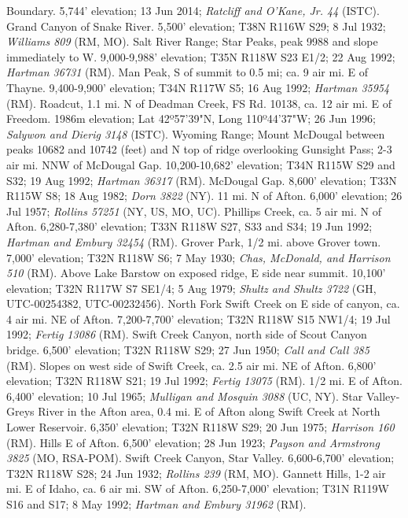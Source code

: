 Boundary. 5,744' elevation; 13 Jun 2014;
\textit{Ratcliff and O'Kane, Jr. 44} (ISTC).
Grand Canyon of Snake River. 5,500' elevation; T38N R116W S29; 8 Jul 1932;
\textit{Williams 809} (RM, MO).
Salt River Range; Star Peaks, peak 9988 and slope immediately to W.
9,000-9,988' elevation; T35N R118W S23 E1/2; 22 Aug 1992;
\textit{Hartman 36731} (RM).
Man Peak, S of summit to 0.5 mi; ca. 9 air mi. E of Thayne.
9,400-9,900' elevation; T34N R117W S5; 16 Aug 1992; \textit{Hartman 35954} (RM).
Roadcut, 1.1 mi. N of Deadman Creek, FS Rd. 10138, ca. 12 air mi. E of Freedom.
1986m elevation; Lat 42º57'39"N, Long 110º44'37"W; 26 Jun 1996;
\textit{Salywon and Dierig 3148} (ISTC).
Wyoming Range; Mount McDougal between peaks 10682 and 10742 (feet) and N top of
ridge overlooking Gunsight Pass; 2-3 air mi. NNW of McDougal Gap. 10,200-10,682'
elevation; T34N R115W S29 and S32; 19 Aug 1992; \textit{Hartman 36317} (RM).
McDougal Gap. 8,600' elevation; T33N R115W S8; 18 Aug 1982;
\textit{Dorn 3822} (NY).
11 mi. N of Afton. 6,000' elevation; 26 Jul 1957;
\textit{Rollins 57251} (NY, US, MO, UC).
Phillips Creek, ca. 5 air mi. N of Afton. 6,280-7,380' elevation;
T33N R118W S27, S33 and S34; 19 Jun 1992;
\textit{Hartman and Embury 32454} (RM).
Grover Park, 1/2 mi. above Grover town. 7,000' elevation; T32N R118W S6;
7 May 1930; \textit{Chas, McDonald, and Harrison 510} (RM).
Above Lake Barstow on exposed ridge, E side near summit.
10,100' elevation; T32N R117W S7 SE1/4; 5 Aug 1979;
\textit{Shultz and Shultz 3722} (GH, UTC-00254382, UTC-00232456).
North Fork Swift Creek on E side of canyon, ca. 4 air mi. NE of Afton.
7,200-7,700' elevation; T32N R118W S15 NW1/4; 19 Jul 1992;
\textit{Fertig 13086} (RM).
Swift Creek Canyon, north side of Scout Canyon bridge.
6,500' elevation; T32N R118W S29; 27 Jun 1950; \textit{Call and Call 385} (RM).
Slopes on west side of Swift Creek, ca. 2.5 air mi. NE of Afton.
6,800' elevation; T32N R118W S21; 19 Jul 1992; \textit{Fertig 13075} (RM).
1/2 mi. E of Afton. 6,400' elevation; 10 Jul 1965;
\textit{Mulligan and Mosquin 3088} (UC, NY).
Star Valley-Greys River in the Afton area, 0.4 mi. E of Afton along Swift Creek
at North Lower Reservoir. 6,350' elevation; T32N R118W S29; 20 Jun 1975;
\textit{Harrison 160} (RM).
Hills E of Afton. 6,500' elevation; 28 Jun 1923;
\textit{Payson and Armstrong 3825} (MO, RSA-POM).
Swift Creek Canyon, Star Valley. 6,600-6,700' elevation; T32N R118W S28;
24 Jun 1932; \textit{Rollins 239} (RM, MO).
Gannett Hills, 1-2 air mi. E of Idaho, ca. 6 air mi. SW of Afton.
6,250-7,000' elevation; T31N R119W S16 and S17; 8 May 1992;
\textit{Hartman and Embury 31962} (RM).
